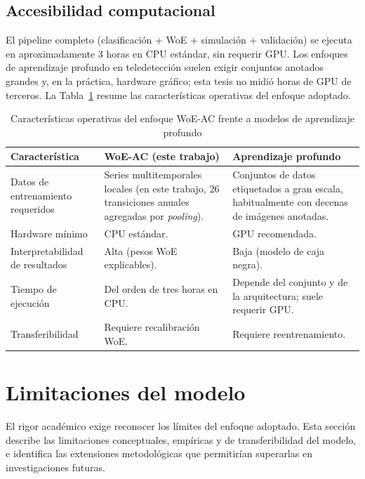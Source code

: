\subsection{Accesibilidad computacional}
\label{sec:accesibilidad}

El pipeline completo (clasificación + WoE + simulación + validación) se ejecuta en aproximadamente 3 horas en CPU estándar, sin requerir GPU. Los enfoques de aprendizaje profundo en teledetección suelen exigir conjuntos anotados grandes \parencite{Ma2019} y, en la práctica, hardware gráfico; esta tesis no midió horas de GPU de terceros. La Tabla~\ref{tab:approach_characteristics} resume las características operativas del enfoque adoptado.

\begin{table}[htbp]
\centering
\caption{Características operativas del enfoque WoE-AC frente a modelos de aprendizaje profundo}
\label{tab:approach_characteristics}
\begin{tabularx}{\textwidth}{@{}>{\raggedright\arraybackslash}p{} X X@{}}
\toprule
\textbf{Característica} & \textbf{WoE-AC (este trabajo)} & \textbf{Aprendizaje profundo} \\
\midrule
Datos de entrenamiento requeridos & Series multitemporales locales (en este trabajo, 26 transiciones anuales agregadas por \textit{pooling}). & Conjuntos de datos etiquetados a gran escala, habitualmente con decenas de imágenes anotadas. \\
Hardware mínimo & CPU estándar. & GPU recomendada. \\
Interpretabilidad de resultados & Alta (pesos WoE explicables). & Baja (modelo de caja negra). \\
Tiempo de ejecución & Del orden de tres horas en CPU. & Depende del conjunto y de la arquitectura; suele requerir GPU. \\
Transferibilidad & Requiere recalibración WoE. & Requiere reentrenamiento. \\
\bottomrule
\end{tabularx}
\end{table}

\section{Limitaciones del modelo}

El rigor académico exige reconocer los límites del enfoque adoptado. Esta sección describe las limitaciones conceptuales, empíricas y de transferibilidad del modelo, e identifica las extensiones metodológicas que permitirían superarlas en investigaciones futuras.

